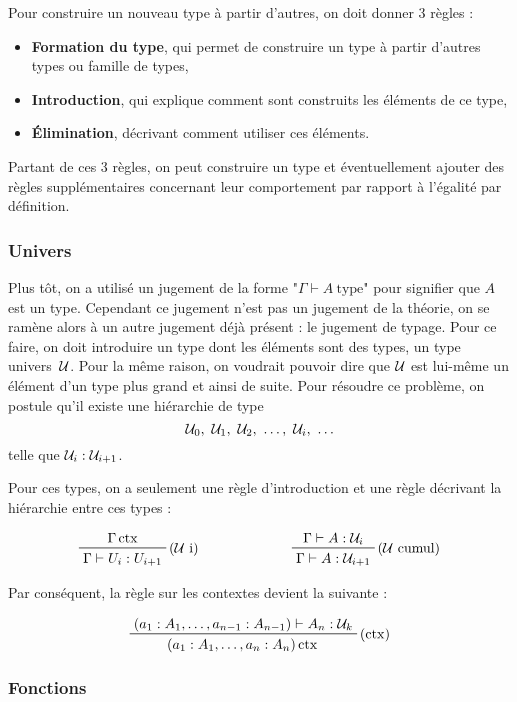 \documentclass[../../rapport.tex]{subfiles}
\begin{document}
  Pour construire un nouveau type à partir d'autres, on doit donner 3 règles :
  \begin{itemize}
    \item \textbf{Formation du type}, qui permet de construire un type à partir d'autres types ou famille de types,
    \item \textbf{Introduction}, qui explique comment sont construits les éléments de ce type,
    \item \textbf{Élimination}, décrivant comment utiliser ces éléments.
  \end{itemize}

  Partant de ces 3 règles, on peut construire un type et éventuellement ajouter des règles supplémentaires concernant
  leur comportement par rapport à l'égalité par définition.

  \subsubsection{Univers}

  Plus tôt, on a utilisé un jugement de la forme "$\Gamma \vdash A\ \text{type}$" pour signifier que $A$ est un type.
  Cependant ce jugement n'est pas un jugement de la théorie, on se ramène alors à un autre jugement déjà présent :
  le jugement de typage.
  Pour ce faire, on doit introduire un type dont les éléments sont des types, un type univers\ $\mathcal U$.
  Pour la même raison, on voudrait pouvoir dire que $\mathcal U$ est lui-même un élément d'un type plus grand et ainsi de suite.
  Pour résoudre ce problème, on postule qu'il existe une hiérarchie de type
  $$\U_0,\ \U_1,\ \U_2,\ \hdots,\ \U_i,\ \hdots$$
  telle que $\mathcal U_i : \mathcal U_{i+1}$.

  Pour ces types, on a seulement une règle d'introduction et une règle décrivant la hiérarchie entre ces types :

  $$
  \begin{array}{cc}
    \prftree[r]{($\U$ i)}{\Gamma \ctx}{\Gamma \vdash U_i : U_{i+1}} \hspace{2cm}
    & \prftree[r]{($\U$ cumul)}{\Gamma \vdash A : \U_i}{\Gamma \vdash A : \U_{i+1}}
  \end{array}
  $$

  Par conséquent, la règle sur les contextes devient la suivante :

  $$
  \prftree[r]{($\ctx$)}{(a_1 : A_1, \hdots, a_{n-1} : A_{n-1}) \vdash A_n : \U_k}
    {(a_1 : A_1, \hdots, a_n : A_n) \ctx}
  $$

  \subsubsection{Fonctions}
\end{document}
